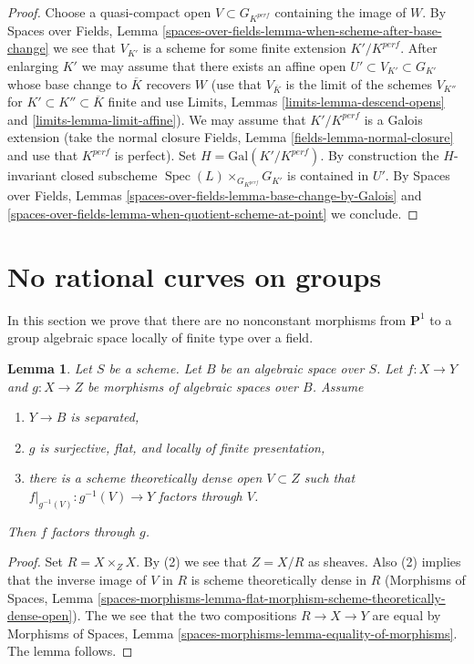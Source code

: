 \documentclass{stacks-project}
\theoremstyle{plain}
\newtheorem{lemma}[subsection]{Lemma}
\theoremstyle{definition}
\theoremstyle{remark}
\numberwithin{equation}{subsection}
\def\Spec{\mathop{\mathrm{Spec}}}
\begin{document}
\begin{proof}
\medskip\noindent
Choose a quasi-compact open $V \subset G_{K^{perf}}$ containing the
image of $W$. By Spaces over Fields,
Lemma \ref{spaces-over-fields-lemma-when-scheme-after-base-change}
we see that $V_{K'}$ is a scheme for some finite extension $K'/K^{perf}$.
After enlarging $K'$ we may assume that there exists an affine open
$U' \subset V_{K'} \subset G_{K'}$ whose base change to $\overline{K}$
recovers $W$ (use that $V_{\overline{K}}$ is the limit of the schemes
$V_{K''}$ for $K' \subset K'' \subset \overline{K}$ finite and use
Limits, Lemmas \ref{limits-lemma-descend-opens} and
\ref{limits-lemma-limit-affine}). We may assume
that $K'/K^{perf}$ is a Galois extension (take the normal closure
Fields, Lemma \ref{fields-lemma-normal-closure} and use
that $K^{perf}$ is perfect). Set $H = \text{Gal}(K'/K^{perf})$.
By construction the $H$-invariant closed subscheme
$\Spec(L) \times_{G_{K^{perf}}} G_{K'}$ is contained in $U'$.
By
Spaces over Fields, Lemmas
\ref{spaces-over-fields-lemma-base-change-by-Galois} and
\ref{spaces-over-fields-lemma-when-quotient-scheme-at-point} we conclude.
\end{proof}





\section{No rational curves on groups}
\label{section-no-rational-curves}

\noindent
In this section we prove that there are no nonconstant morphisms
from $\mathbf{P}^1$ to a group algebraic space locally of finite
type over a field.

\begin{lemma}
\label{lemma-factor-through-over-open}
Let $S$ be a scheme. Let $B$ be an algebraic space over $S$.
Let $f : X \to Y$ and $g : X \to Z$ be morphisms of algebraic
spaces over $B$. Assume
\begin{enumerate}
\item $Y \to B$ is separated,
\item $g$ is surjective, flat, and locally of finite presentation,
\item there is a scheme theoretically dense open $V \subset Z$
such that $f|_{g^{-1}(V)} : g^{-1}(V) \to Y$ factors through $V$.
\end{enumerate}
Then $f$ factors through $g$.
\end{lemma}

\begin{proof}
Set $R = X \times_Z X$. By (2) we see that $Z = X/R$ as sheaves.
Also (2) implies that the inverse image of $V$ in $R$ is scheme
theoretically dense in $R$ (Morphisms of Spaces, Lemma
\ref{spaces-morphisms-lemma-flat-morphism-scheme-theoretically-dense-open}).
The we see that the two compositions
$R \to X \to Y$ are equal by Morphisms of Spaces, Lemma
\ref{spaces-morphisms-lemma-equality-of-morphisms}.
The lemma follows.
\end{proof}
\end{document}
